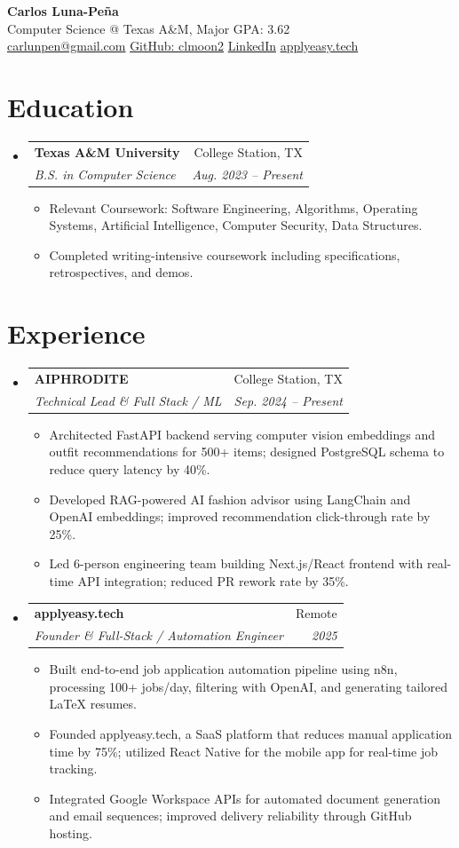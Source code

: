 \documentclass[letterpaper,11pt]{article}
\makeatletter
\newcommand{\resumeItem}[1]{
  \item\small{{#1 \vspace{-2pt}}}
}
\newcommand{\resumeSubheading}[4]{
  \vspace{-2pt}\item
    \begin{tabular*}{0.97\textwidth}[t]{l@{\extracolsep{\fill}}r}
      \textbf{#1} & #2 \\
      \textit{\small#3} & \textit{\small #4} \\
    \end{tabular*}\vspace{-7pt}
}
\newcommand{\resumeSubHeadingListStart}{\begin{itemize}[leftmargin=0.15in, label={}]}
\newcommand{\resumeSubHeadingListEnd}{\end{itemize}}
\newcommand{\resumeItemListStart}{\begin{itemize}}
\newcommand{\resumeItemListEnd}{\end{itemize}\vspace{-5pt}}
\makeatother
\begin{document}
\begin{center}
  \textbf{{\LARGE Carlos Luna-Peña}} \\
  {Computer Science @ Texas A\&M, Major GPA: 3.62} \\
  \href{mailto:carlunpen@gmail.com}{carlunpen@gmail.com} \quad
  \href{https://github.com/clmoon2}{GitHub: clmoon2} \quad
  \href{https://linkedin.com/in/carlos-luna}{LinkedIn} \quad
  \href{https://applyeasy.tech}{applyeasy.tech} \\
\end{center}

\section{Education}
\resumeSubHeadingListStart
\resumeSubheading
{Texas A\&M University}{College Station, TX}
{B.S. in Computer Science}{Aug. 2023 -- Present}
\resumeItemListStart
\resumeItem{Relevant Coursework: Software Engineering, Algorithms, Operating Systems, Artificial Intelligence, Computer Security, Data Structures.}
\resumeItem{Completed writing-intensive coursework including specifications, retrospectives, and demos.}
\resumeItemListEnd
\resumeSubHeadingListEnd

\section{Experience}
\resumeSubHeadingListStart
\resumeSubheading
{AIPHRODITE}{College Station, TX}
{Technical Lead \& Full Stack / ML}{Sep. 2024 -- Present}
\resumeItemListStart
\resumeItem{Architected FastAPI backend serving computer vision embeddings and outfit recommendations for 500+ items; designed PostgreSQL schema to reduce query latency by 40\%.}
\resumeItem{Developed RAG-powered AI fashion advisor using LangChain and OpenAI embeddings; improved recommendation click-through rate by 25\%.}
\resumeItem{Led 6-person engineering team building Next.js/React frontend with real-time API integration; reduced PR rework rate by 35\%.}
\resumeItemListEnd

\resumeSubheading
{applyeasy.tech}{Remote}
{Founder \& Full-Stack / Automation Engineer}{2025}
\resumeItemListStart
\resumeItem{Built end-to-end job application automation pipeline using n8n, processing 100+ jobs/day, filtering with OpenAI, and generating tailored LaTeX resumes.}
\resumeItem{Founded applyeasy.tech, a SaaS platform that reduces manual application time by 75\%; utilized React Native for the mobile app for real-time job tracking.}
\resumeItem{Integrated Google Workspace APIs for automated document generation and email sequences; improved delivery reliability through GitHub hosting.}
\resumeItemListEnd
\resumeSubHeadingListEnd
\end{document}
